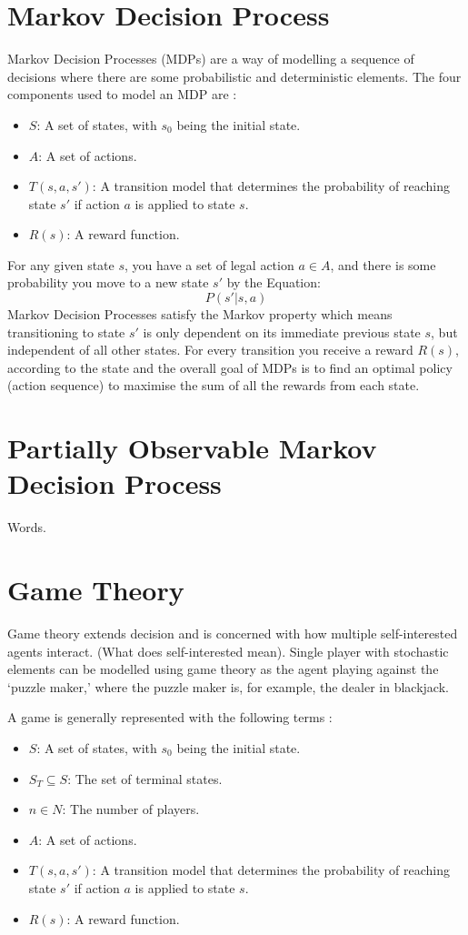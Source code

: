 \documentclass{bhamthesis}
\theoremstyle{definition}
\begin{document}
\section{Markov Decision Process}\label{s:mdp}
Markov Decision Processes (MDPs) are a way of modelling a sequence of decisions where there are some probabilistic and deterministic elements. The four components used to model an MDP are \cite{Russell2016}:

\begin{itemize}
	\item $S$: A set of states, with $s_0$ being the initial state.
	\item $A$: A set of actions.
	\item $T(s,a,s')$: A transition model that determines the probability of reaching state $s'$ if action $a$ is applied to state $s$.
	\item $R(s)$: A reward function.
\end{itemize}
For any given state $s$, you have a set of legal action $a \in A$, and there is some probability  you move to a new state $s'$ by the Equation:
\begin{equation}\label{mdp}
P(s' | s,a)
\end{equation}
Markov Decision Processes satisfy the Markov property which means transitioning to state $s'$ is only dependent on its immediate previous state $s$, but independent of all other states. For every transition you receive a reward $R(s)$, according to the state and the overall goal of MDPs is to find an optimal policy (action sequence) to maximise the sum of all the rewards from each state.


\section{Partially Observable Markov Decision Process}\label{s:pomdb}
Words.
\section{Game Theory}
Game theory extends decision and is concerned with how multiple self-interested agents interact. (What does self-interested mean). Single player with stochastic elements can be modelled using game theory as the agent playing against the `puzzle maker,' where the puzzle maker is, for example, the dealer in blackjack.

A game is generally represented with the following terms \cite{Browne2012}:

\begin{itemize}
	\item $S$: A set of states, with $s_0$ being the initial state.
	\item $S_T \subseteq S$: The set of terminal states.
	\item $n \in N$: The number of players.
	\item $A$: A set of actions.
	\item $T(s,a,s')$: A transition model that determines the probability of reaching state $s'$ if action $a$ is applied to state $s$.
	\item $R(s)$: A reward function.
\end{itemize}
\end{document}
